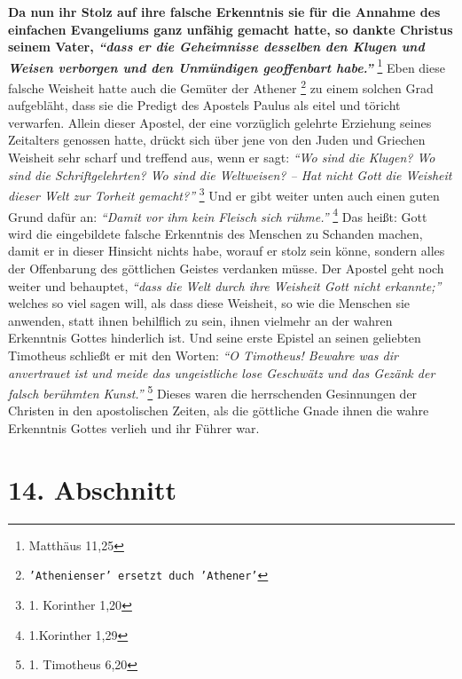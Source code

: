 \textbf{Da nun ihr Stolz auf ihre falsche Erkenntnis
sie für die Annahme des einfachen
Evangeliums ganz unfähig gemacht hatte, so dankte Christus seinem Vater,
\textit{"`dass er die Geheimnisse desselben den Klugen und Weisen verborgen und
den Unmündigen geoffenbart habe."'}}
\footnote{Matthäus 11,25}
Eben diese falsche Weisheit hatte
auch die Gemüter der Athener
\footnote{\texttt{'Athenienser' ersetzt duch 'Athener'}} zu einem solchen Grad
aufgebläht, dass sie
die Predigt des Apostels Paulus als eitel und töricht
verwarfen. Allein dieser
Apostel, der eine vorzüglich gelehrte Erziehung seines Zeitalters genossen
hatte, drückt sich über jene von den Juden und
Griechen
Weisheit sehr scharf und treffend aus, wenn er sagt:
\textit{"`Wo sind die Klugen? Wo
sind die Schriftgelehrten? Wo sind die Weltweisen? -- Hat nicht Gott die
Weisheit dieser Welt zur Torheit gemacht?"'}
\footnote{1. Korinther 1,20}
Und er
gibt weiter unten auch einen guten Grund dafür an:
\textit{"`Damit vor ihm kein Fleisch sich rühme."'}
\footnote{1.Korinther 1,29}
Das heißt: Gott wird die eingebildete
falsche Erkenntnis des Menschen zu Schanden machen, damit er in dieser Hinsicht
nichts habe, worauf er stolz sein könne, sondern alles der
Offenbarung des
göttlichen Geistes verdanken müsse. Der Apostel geht noch weiter und behauptet,
\textit{"`dass die Welt durch ihre Weisheit Gott nicht erkannte;"'}
welches so viel sagen
will, als dass diese Weisheit, so wie die Menschen sie anwenden, statt ihnen
behilflich zu sein, ihnen vielmehr an der wahren Erkenntnis Gottes hinderlich
ist. Und seine erste Epistel an seinen geliebten Timotheus schließt er mit den
Worten:
\textit{"`O Timotheus! Bewahre was dir anvertrauet ist und meide das
ungeistliche lose Geschwätz und das Gezänk der falsch berühmten
Kunst."'}
\footnote{1. Timotheus 6,20}
Dieses waren die herrschenden Gesinnungen der
Christen in den apostolischen Zeiten, als die göttliche Gnade ihnen die wahre
Erkenntnis Gottes verlieh und ihr Führer war.

\section{14. Abschnitt} \label{kap7_ab14}

